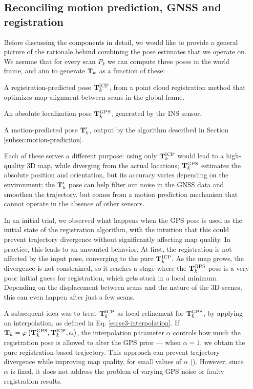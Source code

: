 \subsection{Reconciling motion prediction, GNSS and registration}
\label{subsec:reconciling}
Before discussing the components in detail, we would like to provide a general picture of the rationale behind combining the pose estimates that we operate on. We assume that for every scan $P_k$ we can compute three poses in the world frame, and aim to generate $\mathbf{T}_k$ as a function of these:
\newcommand{\tkicp}{\pose_k^{\text{ICP}}}
\newcommand{\tkgps}{\pose_k^{\text{GPS}}}
\newcommand{\covicp}{\matx{\Sigma}_{\text{ICP}}}
\newcommand{\covgps}{\matx{\Sigma}_{\text{GPS}}}
\begin{compactenum}
	\item A registration-predicted pose $\tkicp$, from a point cloud registration method that optimizes map alignment between scans in the global frame.
	\item An absolute localization pose $\tkgps$, generated by the INS sensor.
	\item A motion-predicted pose $\mathbf{T}_k'$, output by the algorithm described in Section \ref{subsec:motion-prediction}.
\end{compactenum}

Each of these serves a different purpose: using only $\tkicp$ would lead to a high-quality 3D map, while diverging from the actual locations; $\tkgps$ estimates the absolute position and orientation, but its accuracy varies depending on the environment; the $\mathbf{T}_k'$ pose can help filter out noise in the GNSS data and smoothen the trajectory, but comes from a motion prediction mechanism that cannot operate in the absence of other sensors.

In an initial trial, we observed what happens when the GPS pose is used as the initial state of the registration algorithm, with the intuition that this could prevent trajectory divergence without significantly affecting map quality. In practice, this leads to an unwanted behavior. At first, the registration is not affected by the input pose, converging to the pure $\tkicp$. As the map grows, the divergence is not constrained, so it reaches a stage where the $\tkgps$ pose is a very poor initial guess for registration, which gets stuck in a local minimum. Depending on the displacement between scans and the nature of the 3D scenes, this can even happen after just a few scans.

A subsequent idea was to treat $\tkicp$ as local refinement for $\tkgps$, by applying an interpolation, as defined in Eq. \ref{eq:se3-interpolation}. If $\pose_k = \varphi\left(\tkgps, \tkicp, \alpha\right)$, the interpolation parameter $\alpha$ controls how much the registration pose is allowed to alter the GPS prior --- when $\alpha = 1$, we obtain the pure registration-based trajectory. This approach can prevent trajectory divergence while improving map quality, for small values of $\alpha$ (). However, since $\alpha$ is fixed, it does not address the problem of varying GPS noise or faulty registration results.

